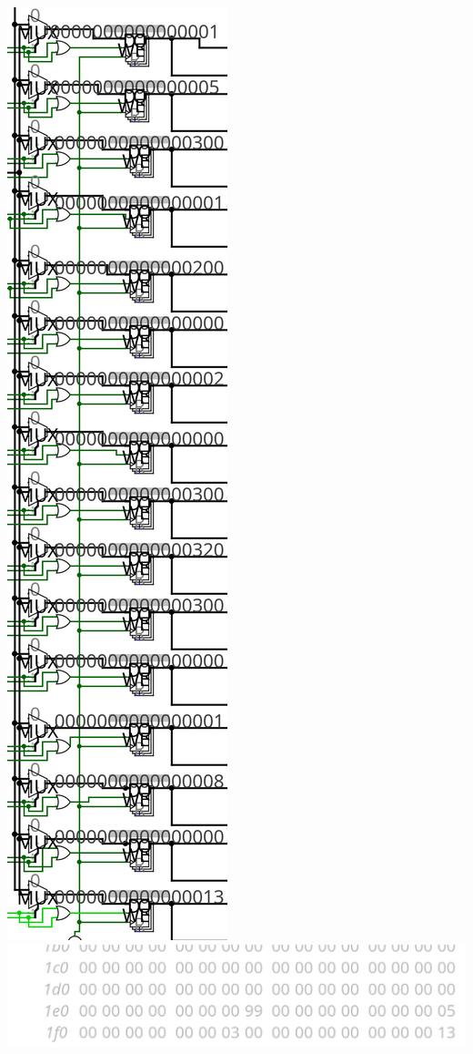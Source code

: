 \documentclass{article}
\begin{document}
\begin{center}
    \includegraphics[scale=.4]{palReg.png} 
    \includegraphics[scale=.5]{palMem1.png} 

\end{center}
\end{document}
